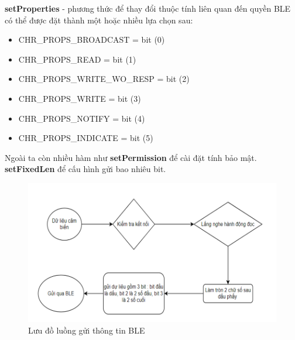 


\textbf{setProperties} - phương thức để thay đổi thuộc tính liên quan đến quyền BLE có thể được đặt thành một hoặc nhiều lựa chọn sau:

\begin{itemize}
    \item CHR\_PROPS\_BROADCAST = bit (0)
    
    \item CHR\_PROPS\_READ = bit (1)
    
    \item CHR\_PROPS\_WRITE\_WO\_RESP = bit (2)
    
    \item CHR\_PROPS\_WRITE = bit (3)
    
    \item CHR\_PROPS\_NOTIFY = bit (4)
    
    \item CHR\_PROPS\_INDICATE = bit (5)
\end{itemize}
Ngoài ta còn nhiều hàm như \textbf{setPermission} để cài đặt tính bảo mật. \textbf{setFixedLen} để cấu hình gửi bao nhiêu bit.





\begin{figure}[!]
		\centering
 		\includegraphics[width=1\textwidth]{images/sendBleFlow.png}
		\caption{Lưu đồ luồng gửi thông tin BLE}
		\label{sendBleFlow}
\end{figure}



















